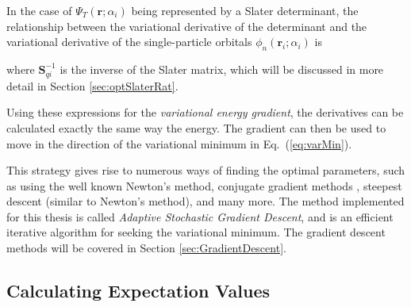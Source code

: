 
In the case of $\Psi_T(\mathbf{r}; \alpha_i)$ being represented by a Slater determinant, the relationship between the variational derivative of the determinant and the variational derivative of the single-particle orbitals $\phi_n(\mathbf{r}_i; \alpha_i)$ is


where $\mathbf{S}^{-1}_{qi}$ is the inverse of the Slater matrix, which will be discussed in more detail in Section \ref{sec:optSlaterRat}. 

Using these expressions for the \textit{variational energy gradient}, the derivatives can be calculated exactly the same way the energy. The gradient can then be used to move in the direction of the variational minimum in Eq.~(\ref{eq:varMin}). 

This strategy gives rise to numerous ways of finding the optimal parameters, such as using the well known Newton's method, conjugate gradient methods \cite{golub1996matrix}, steepest descent (similar to Newton's method), and many more. 
The method implemented for this thesis is called \textit{Adaptive Stochastic Gradient Descent}, and is an efficient iterative algorithm for seeking the variational minimum. The gradient descent methods will be covered in Section \ref{sec:GradientDescent}.

\subsection{Calculating Expectation Values}
\label{sec:calcExpVals}

